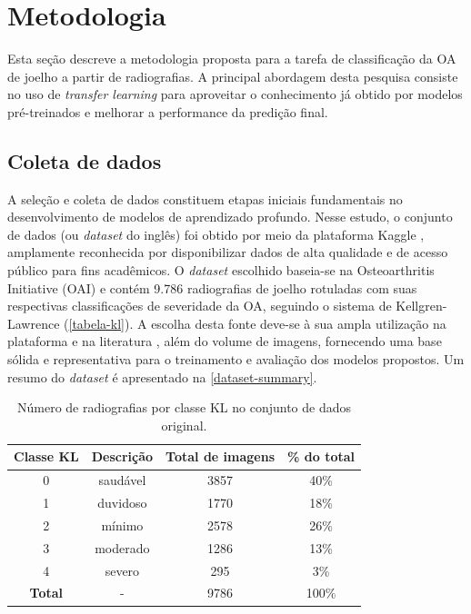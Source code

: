 \chapter{Metodologia}\label{cap:proposta}

Esta seção descreve a metodologia proposta para a tarefa de classificação da OA de joelho a partir de radiografias. A principal abordagem desta pesquisa consiste no uso de \textit{transfer learning} para aproveitar o conhecimento já obtido por modelos pré-treinados e melhorar a performance da predição final.

\section{Coleta de dados}

A seleção e coleta de dados constituem etapas iniciais fundamentais no desenvolvimento de modelos de aprendizado profundo. Nesse estudo, o conjunto de dados (ou \textit{dataset} do inglês) foi obtido por meio da plataforma Kaggle \citep{dataset-kaggle}, amplamente reconhecida por disponibilizar dados de alta qualidade e de acesso público para fins acadêmicos. O \textit{dataset} escolhido baseia-se na Osteoarthritis Initiative (OAI) e contém 9.786 radiografias de joelho rotuladas com suas respectivas classificações de severidade da OA, seguindo o sistema de Kellgren-Lawrence (\autoref{tabela-kl}). A escolha desta fonte deve-se à sua ampla utilização na plataforma e na literatura \citep{Tariq2023, Mohammed2023}, além do volume de imagens, fornecendo uma base sólida e representativa para o treinamento e avaliação dos modelos propostos. Um resumo do \textit{dataset} é apresentado na \autoref{dataset-summary}.

\begin{table}[ht]
    \centering
    \begin{tabular}{|c|c|c|c|}
        \hline
        \textbf{Classe KL} & \textbf{Descrição} & \textbf{Total de imagens} & \textbf{\% do total} \\
        \hline
        0 & saudável & 3857 & 40\% \\
        1 & duvidoso & 1770 & 18\% \\
        2 & mínimo & 2578 & 26\% \\
        3 & moderado & 1286 & 13\% \\
        4 & severo & 295 & 3\% \\
        \hline
        \textbf{Total} & - & 9786 & 100\% \\
        \hline
    \end{tabular}
    \caption{Número de radiografias por classe KL no conjunto de dados original.}
    \label{dataset-summary}
\end{table}

